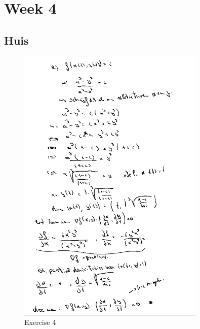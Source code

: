 \documentclass[a4paper]{report}
\begin{document}



\section{Week 4}

\subsection{Huis}

\begin{figure}[H]
	\centering
	\includegraphics[width=0.8\textwidth]{assets/huis_4_ex_4.png}
	\caption{Exercise 4}
	\label{fig:huis_4_ex_4}
\end{figure}
\end{document}
